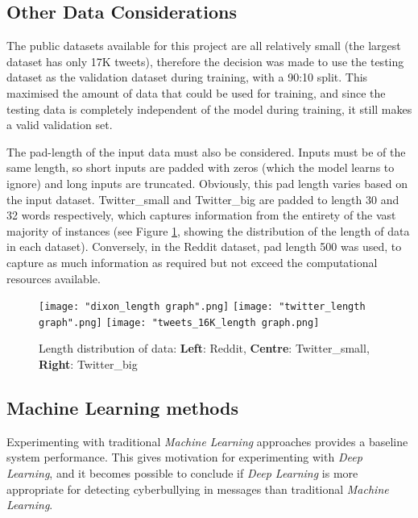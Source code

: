 \documentclass[12pt,a4paper]{article}
\begin{document}
\subsection{Other Data Considerations}
The public datasets available for this project are all relatively small (the largest dataset has only 17K tweets), therefore the decision was made to use the testing dataset as the validation dataset during training, with a 90:10 split. This maximised the amount of data that could be used for training, and since the testing data is completely independent of the model during training, it still makes a valid validation set. 

The pad-length of the input data must also be considered. Inputs must be of the same length, so short inputs are padded with zeros (which the model learns to ignore) and long inputs are truncated. Obviously, this pad length varies based on the input dataset. Twitter\_small and Twitter\_big are padded to length 30 and 32 words respectively, which captures information from the entirety of the vast majority of instances (see Figure \ref{len:len3}, showing the distribution of the length of data in each dataset). Conversely, in the Reddit dataset, pad length 500 was used, to capture as much information as required but not exceed the computational resources available.

\begin{figure}[H]
	\centering
	\hspace*{-0.10\textwidth}
	\texttt{[image: "dixon\_length graph".png]} \hfill
	\texttt{[image: "twitter\_length graph".png]}\hfill
	\texttt{[image: "tweets\_16K\_length graph.png]} \hfill
	\hspace*{-0.10\textwidth}
	
	\caption{Length distribution of data: \textbf{Left}: Reddit, \textbf{Centre}: Twitter\_small, \textbf{Right}: Twitter\_big}
	\label{len:len3}
\end{figure}


\subsection{Machine Learning methods}
Experimenting with traditional \textit{Machine Learning} approaches provides a baseline system performance. This gives motivation for experimenting with \textit{Deep Learning}, and it becomes possible to conclude if \textit{Deep Learning} is more appropriate for detecting cyberbullying in messages than traditional \textit{Machine Learning}.
\end{document}
